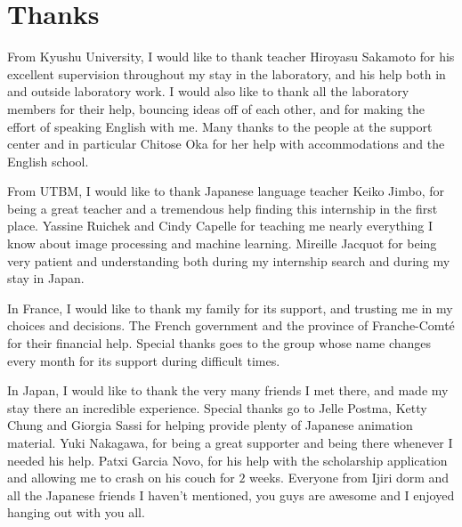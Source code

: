 \section*{Thanks}
From Kyushu University, I would like to thank teacher Hiroyasu Sakamoto for his excellent supervision throughout my stay in the laboratory, and his help both in and outside laboratory work. I would also like to thank all the laboratory members for their help, bouncing ideas off of each other, and for making the effort of speaking English with me. Many thanks to the people at the support center and in particular Chitose Oka for her help with accommodations and the English school.

From UTBM, I would like to thank Japanese language teacher Keiko Jimbo, for being a great teacher and a tremendous help finding this internship in the first place. Yassine Ruichek and Cindy Capelle for teaching me nearly everything I know about image processing and machine learning. Mireille Jacquot for being very patient and understanding both during my internship search and during my stay in Japan.

In France, I would like to thank my family for its support, and trusting me in my choices and decisions. The French government and the province of Franche-Comté for their financial help. Special thanks goes to the group whose name changes every month for its support during difficult times.

In Japan, I would like to thank the very many friends I met there, and made my stay there an incredible experience. Special thanks go to Jelle Postma, Ketty Chung and Giorgia Sassi for helping provide plenty of Japanese animation material. Yuki Nakagawa, for being a great supporter and being there whenever I needed his help. Patxi Garcia Novo, for his help with the scholarship application and allowing me to crash on his couch for $2$ weeks. Everyone from Ijiri dorm and all the Japanese friends I haven't mentioned, you guys are awesome and I enjoyed hanging out with you all.
